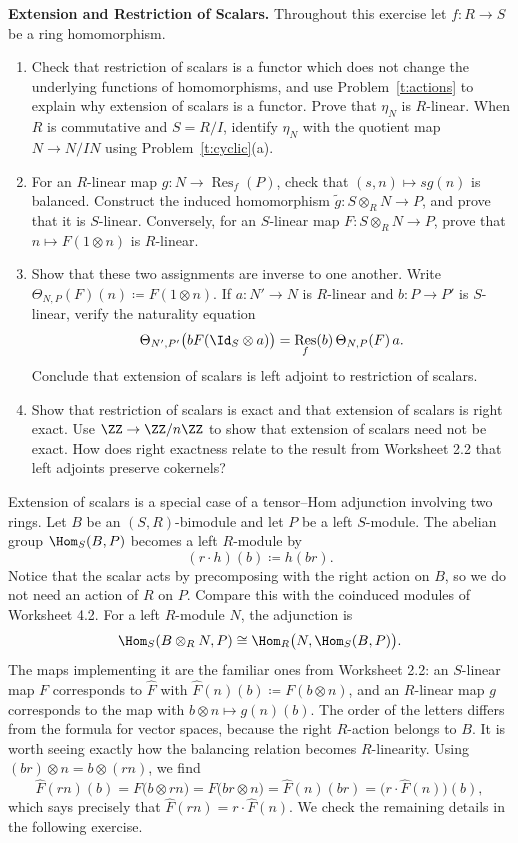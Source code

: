 \documentclass[12pt,reqno]{amsart}
\DeclareMathOperator{\Res}{Res}
\begin{document}
\begin{problems}
\item\label{t:scalars} \textbf{Extension and Restriction of Scalars.} Throughout this exercise let $f:R\to S$ be a ring homomorphism.
\begin{enumerate}
\item Check that restriction of scalars is a functor which does not change the underlying functions of homomorphisms, and use Problem~\ref{t:actions} to explain why extension of scalars is a functor. Prove that $\eta_N$ is $R$-linear. When $R$ is commutative and $S=R/I$, identify $\eta_N$ with the quotient map $N\to N/IN$ using Problem~\ref{t:cyclic}(a).
\item For an $R$-linear map $g:N\to\Res_f(P)$, check that $(s,n)\mapsto sg(n)$ is balanced. Construct the induced homomorphism $\widetilde g:S\otimes_RN\to P$, and prove that it is $S$-linear. Conversely, for an $S$-linear map $F:S\otimes_RN\to P$, prove that $n\mapsto F(1\otimes n)$ is $R$-linear.
\item Show that these two assignments are inverse to one another. Write $\Theta_{N,P}(F)(n)\coloneqq F(1\otimes n)$. If $a:N'\to N$ is $R$-linear and $b:P\to P'$ is $S$-linear, verify the naturality equation
\[
\Theta_{N',P'}\bigl(bF(\Id_S\otimes a)\bigr)=\Res_f(b)\,\Theta_{N,P}(F)\,a.
\]
Conclude that extension of scalars is left adjoint to restriction of scalars.
\item Show that restriction of scalars is exact and that extension of scalars is right exact. Use $\ZZ\to\ZZ/n\ZZ$ to show that extension of scalars need not be exact. How does right exactness relate to the result from Worksheet 2.2 that left adjoints preserve cokernels?
\end{enumerate}
\end{problems}

\hrulefill

Extension of scalars is a special case of a tensor--Hom adjunction involving two rings. Let $B$ be an $(S,R)$-bimodule and let $P$ be a left $S$-module. The abelian group $\Hom_S(B,P)$ becomes a left $R$-module by
\[
(r\cdot h)(b)\coloneqq h(br).
\]
Notice that the scalar acts by precomposing with the right action on $B$, so we do not need an action of $R$ on $P$. Compare this with the coinduced modules of Worksheet 4.2. For a left $R$-module $N$, the adjunction is
\[
\Hom_S(B\otimes_RN,P)\cong\Hom_R\bigl(N,\Hom_S(B,P)\bigr).
\]
The maps implementing it are the familiar ones from Worksheet 2.2: an $S$-linear map $F$ corresponds to $\widehat F$ with $\widehat F(n)(b)\coloneqq F(b\otimes n)$, and an $R$-linear map $g$ corresponds to the map with $b\otimes n\mapsto g(n)(b)$. The order of the letters differs from the formula for vector spaces, because the right $R$-action belongs to $B$. It is worth seeing exactly how the balancing relation becomes $R$-linearity. Using $(br)\otimes n=b\otimes(rn)$, we find
\[
\widehat F(rn)(b)=F\bigl(b\otimes rn\bigr)=F\bigl(br\otimes n\bigr)=\widehat F(n)(br)=\bigl(r\cdot\widehat F(n)\bigr)(b),
\]
which says precisely that $\widehat F(rn)=r\cdot\widehat F(n)$. We check the remaining details in the following exercise.
\end{document}

